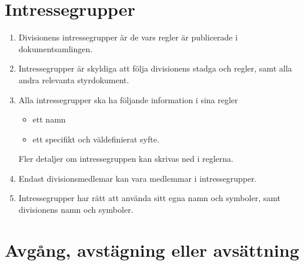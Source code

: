 \documentclass{dvd}
\begin{document}
	\section{Intressegrupper}

	\begin{enumerate}[label=\arabic* §, ref=\arabic*]
		\item Divisionens intressegrupper är de vars regler är publicerade i dokumentsamlingen.

		\item Intressegrupper är skyldiga att följa divisionens stadga och regler, samt alla andra relevanta styrdokument.

		\item Alla intressegrupper ska ha följande information i sina regler

		\begin{itemize}
			\item ett namn
			\item ett specifikt och väldefinierat syfte.
		\end{itemize}

		Fler detaljer om intressegruppen kan skrivas ned i reglerna.

		\item Endast divisionsmedlemar kan vara medlemmar i intressegrupper.

		\item Intressegrupper har rätt att använda sitt egna namn och symboler, samt divisionens namn och symboler.
	\end{enumerate}

	\section{Avgång, avstägning eller avsättning}
\end{document}

